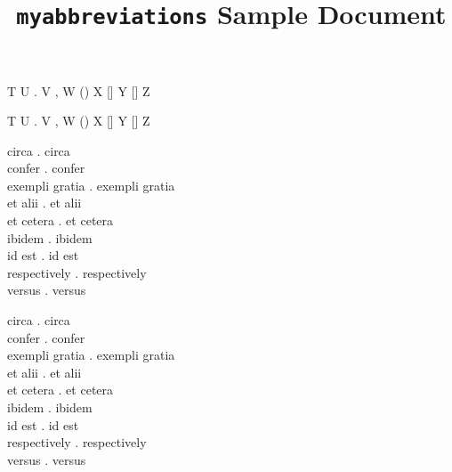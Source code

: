 \documentclass{article}
\begin{document}
\title{\texttt{myabbreviations} Sample Document}
\author{}
\date{}

\maketitle

\begin{verbatim*}
\usepackage[italics]{myabbreviations}
\end{verbatim*}

\begin{verbatim*}
\DeclareAbbreviation{}
T \abc U \abc. V \abc, W (\abc) X [\abc] Y [\abc{}] Z
\end{verbatim*}
%
\DeclareAbbreviation{}
T \abc U \abc. V \abc, W (\abc) X [\abc] Y [\abc{}] Z

\begin{verbatim*}
\ca circa \ca. circa\\
\cf confer \cf. confer\\
\eg exempli gratia \eg. exempli gratia\\
\etal et alii \etal. et alii\\
\etc et cetera \etc. et cetera\\
\ibid ibidem \ibid. ibidem\\
\ie id est \ie. id est\\
\resp respectively \resp. respectively\\
\vs versus \vs. versus
\end{verbatim*}
%
\ca circa \ca. circa \\
\cf confer \cf. confer \\
\eg exempli gratia \eg. exempli gratia \\
\etal et alii \etal. et alii \\
\etc et cetera \etc. et cetera \\
\ibid ibidem \ibid. ibidem \\
\ie id est \ie. id est \\
\resp respectively \resp. respectively \\
\vs versus \vs. versus
\end{document}
